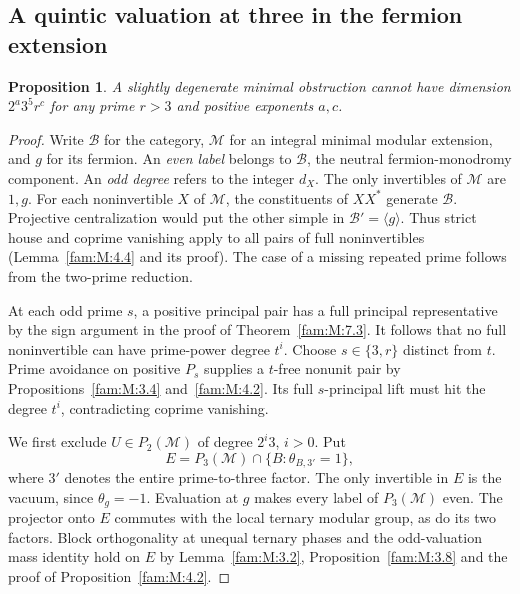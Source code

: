 \documentclass[11pt,a4paper]{article}
\numberwithin{equation}{section}
\newtheorem{proposition}[theorem]{Proposition}
\theoremstyle{remark}
\begin{document}
\subsection{A quintic valuation at three in the fermion extension}\label{fam:F:sec:3}
\begin{proposition}\label{fam:F:3.1}\label{fam:F:n:lifted}
A slightly degenerate minimal obstruction cannot have dimension $2^a3^5r^c$ for any prime $r>3$ and positive exponents $a,c$.
\end{proposition}
\begin{proof}
Write $\mathcal B$ for the category, $\mathcal M$ for an integral minimal modular extension, and $g$ for its fermion. An \emph{even label} belongs to $\mathcal B$, the neutral fermion-monodromy component. An \emph{odd degree} refers to the integer $d_X$. The only invertibles of $\mathcal M$ are $1,g$. For each noninvertible $X$ of $\mathcal M$, the constituents of $XX^*$ generate $\mathcal B$. Projective centralization would put the other simple in $\mathcal B'=\langle g\rangle$. Thus strict house and coprime vanishing apply to all pairs of full noninvertibles (Lemma~\ref{fam:M:4.4} and its proof). The case of a missing repeated prime follows from the two-prime reduction.

At each odd prime $s$, a positive principal pair has a full principal
representative by the sign argument in the proof of Theorem~\ref{fam:M:7.3}.
It follows that no full noninvertible can have prime-power degree $t^i$. Choose $s\in\{3,r\}$ distinct from $t$. Prime avoidance on positive $P_s$ supplies a $t$-free nonunit pair by Propositions~\ref{fam:M:3.4} and~\ref{fam:M:4.2}. Its full $s$-principal lift must hit the degree $t^i$, contradicting coprime vanishing.

We first exclude $U\in P_2(\mathcal M)$ of degree $2^i3$, $i>0$. Put
\[
 E=P_3(\mathcal M)\cap\{B:\theta_{B,3'}=1\},
\]
where $3'$ denotes the entire prime-to-three factor. The only invertible in $E$ is the vacuum, since $\theta_g=-1$. Evaluation at $g$ makes every label of $P_3(\mathcal M)$ even. The projector onto $E$ commutes with the local ternary modular group, as do its two factors. Block orthogonality at unequal ternary phases and the odd-valuation mass identity hold on $E$ by Lemma~\ref{fam:M:3.2}, Proposition~\ref{fam:M:3.8} and the proof of Proposition~\ref{fam:M:4.2}.


\end{proof}
\end{document}
